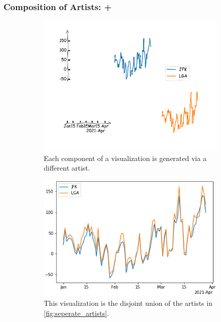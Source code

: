 \documentclass[../main.tex]{subfiles}
\begin{document}
\subsubsection{Composition of Artists: +}
\begin{figure}[H]
\begin{subfigure}{.5\textwidth}
    \includegraphics[width=1\textwidth]{figures/math/exploding_artist.png}
    \caption{Each component of a visualization is generated via a different artist.}
    \label{fig:seperate_artists}    
\end{subfigure}
\begin{subfigure}{.5\textwidth}
    \includegraphics[width=1\textwidth]{figures/math/combined_artist.png}
    \caption{This visualization is the disjoint union of the artists in \autoref{fig:seperate_artists}.}
    \label{fig:combined_artists}
\end{subfigure}
\caption{}
\label{fig:artist_plus}
\end{figure}
\end{document}
